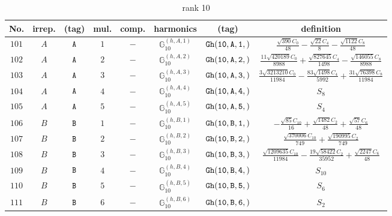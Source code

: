 \documentclass[fleqn,8pt]{jsarticle}
\begin{document}
\begin{table}[ht!]
\begin{center}
\caption{rank 10}
\renewcommand{\arraystretch}{1.3}
\begin{tabular}{cccccccc} \hline \hline
No. & irrep. & (tag) & mul. & comp. & harmonics & (tag) & definition \\ \hline
$ 101 $ & $ A $ & $ {\tt A} $ & $ 1 $ & $ - $ & $ \mathbb{G}_{10}^{(h,A,1)} $ & $ {\tt Gh(10,A,1,)} $ & $ \frac{\sqrt{390} C_{0}}{48} - \frac{\sqrt{22} C_{4}}{8} - \frac{\sqrt{1122} C_{8}}{48} $ \\
$ 102 $ & $ A $ & $ {\tt A} $ & $ 2 $ & $ - $ & $ \mathbb{G}_{10}^{(h,A,2)} $ & $ {\tt Gh(10,A,2,)} $ & $ \frac{11 \sqrt{420189} C_{0}}{8988} + \frac{\sqrt{827645} C_{4}}{1498} - \frac{\sqrt{146055} C_{8}}{8988} $ \\
$ 103 $ & $ A $ & $ {\tt A} $ & $ 3 $ & $ - $ & $ \mathbb{G}_{10}^{(h,A,3)} $ & $ {\tt Gh(10,A,3,)} $ & $ \frac{3 \sqrt{3213210} C_{0}}{11984} - \frac{83 \sqrt{1498} C_{4}}{5992} + \frac{31 \sqrt{76398} C_{8}}{11984} $ \\
$ 104 $ & $ A $ & $ {\tt A} $ & $ 4 $ & $ - $ & $ \mathbb{G}_{10}^{(h,A,4)} $ & $ {\tt Gh(10,A,4,)} $ & $ S_{8} $ \\
$ 105 $ & $ A $ & $ {\tt A} $ & $ 5 $ & $ - $ & $ \mathbb{G}_{10}^{(h,A,5)} $ & $ {\tt Gh(10,A,5,)} $ & $ S_{4} $ \\
$ 106 $ & $ B $ & $ {\tt B} $ & $ 1 $ & $ - $ & $ \mathbb{G}_{10}^{(h,B,1)} $ & $ {\tt Gh(10,B,1,)} $ & $ - \frac{\sqrt{85} C_{10}}{16} + \frac{\sqrt{1482} C_{2}}{48} + \frac{\sqrt{57} C_{6}}{48} $ \\
$ 107 $ & $ B $ & $ {\tt B} $ & $ 2 $ & $ - $ & $ \mathbb{G}_{10}^{(h,B,2)} $ & $ {\tt Gh(10,B,2,)} $ & $ \frac{\sqrt{370006} C_{10}}{749} + \frac{\sqrt{190995} C_{2}}{749} $ \\
$ 108 $ & $ B $ & $ {\tt B} $ & $ 3 $ & $ - $ & $ \mathbb{G}_{10}^{(h,B,3)} $ & $ {\tt Gh(10,B,3,)} $ & $ \frac{\sqrt{1209635} C_{10}}{11984} - \frac{19 \sqrt{58422} C_{2}}{35952} + \frac{\sqrt{2247} C_{6}}{48} $ \\
$ 109 $ & $ B $ & $ {\tt B} $ & $ 4 $ & $ - $ & $ \mathbb{G}_{10}^{(h,B,4)} $ & $ {\tt Gh(10,B,4,)} $ & $ S_{10} $ \\
$ 110 $ & $ B $ & $ {\tt B} $ & $ 5 $ & $ - $ & $ \mathbb{G}_{10}^{(h,B,5)} $ & $ {\tt Gh(10,B,5,)} $ & $ S_{6} $ \\
$ 111 $ & $ B $ & $ {\tt B} $ & $ 6 $ & $ - $ & $ \mathbb{G}_{10}^{(h,B,6)} $ & $ {\tt Gh(10,B,6,)} $ & $ S_{2} $ \\

\end{tabular}
\end{center}
\end{table}
\end{document}
